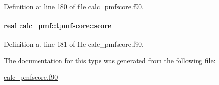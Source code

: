 Definition at line 180 of file calc\-\_\-pmfscore.\-f90.

\hypertarget{structcalc__pmf_1_1tpmfscore_a08b2a410e79c5b5e2d3366ff09e1fa55}{
\paragraph[{score}]{\setlength{\rightskip}{0pt plus 5cm}real calc\-\_\-pmf\-::tpmfscore\-::score}}\label{structcalc__pmf_1_1tpmfscore_a08b2a410e79c5b5e2d3366ff09e1fa55}


Definition at line 181 of file calc\-\_\-pmfscore.\-f90.



The documentation for this type was generated from the following file\-:\begin{DoxyCompactItemize}
\item 
\hyperlink{calc__pmfscore_8f90}{calc\-\_\-pmfscore.\-f90}\end{DoxyCompactItemize}
